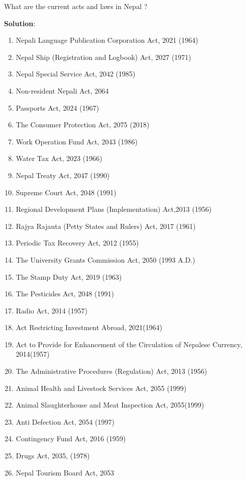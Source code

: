 \documentclass[
  openany]{book}
\newcommand{\question}{\item}
\newenvironment{solution}{ {\bfseries Solution}:}{}
\begin{document}
\begin{questions}

\question What are the current acts and laws in Nepal ?

\begin{solution}
\begin{enumerate}
\item Nepali Language Publication Corporation Act, 2021 (1964)
\item Nepal Ship (Registration and Logbook) Act, 2027 (1971)
\item Nepal Special Service Act, 2042 (1985)
\item Non-resident Nepali Act, 2064
\item Passports Act, 2024 (1967)
\item The Consumer Protection Act, 2075 (2018)
\item Work Operation Fund Act, 2043 (1986)
\item Water Tax Act, 2023 (1966)
\item Nepal Treaty Act, 2047 (1990)
\item Supreme Court Act, 2048 (1991)
\item Regional Development Plans (Implementation) Act,2013 (1956)
\item Rajya Rajauta (Petty States and Rulers) Act, 2017 (1961)
\item Periodic Tax Recovery Act, 2012 (1955)
\item The University Grants Commission Act, 2050 (1993 A.D.)
\item The Stamp Duty Act, 2019 (1963)
\item The Pesticides Act, 2048 (1991)
\item Radio Act, 2014 (1957)
\item Act Restricting Investment Abroad, 2021(1964)
\item Act to Provide for Enhancement of the Circulation of Nepalese Currency, 2014(1957)
\item The Administrative Procedures (Regulation) Act, 2013 (1956)
\item Animal Health and Livestock Services Act, 2055 (1999)
\item Animal Slaughterhouse and Meat Inspection Act, 2055(1999)
\item Anti Defection Act, 2054 (1997)
\item Contingency Fund Act, 2016 (1959)
\item Drugs Act, 2035, (1978)
\item Nepal Tourism Board Act, 2053

\end{enumerate}
\end{solution}
\end{questions}
\end{document}
